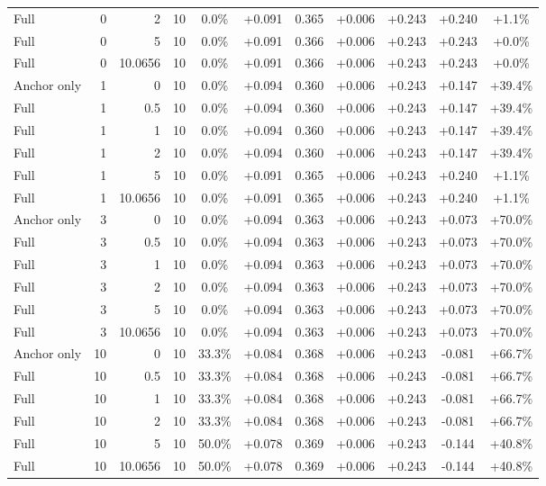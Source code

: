 \begin{table}[htbp]
\begin{tabular}{lrrrccccccc}
Full & 0 & 2 & 10 & 0.0\% & +0.091 & 0.365 & +0.006 & +0.243 & +0.240 & +1.1\% \\
Full & 0 & 5 & 10 & 0.0\% & +0.091 & 0.366 & +0.006 & +0.243 & +0.243 & +0.0\% \\
Full & 0 & 10.0656 & 10 & 0.0\% & +0.091 & 0.366 & +0.006 & +0.243 & +0.243 & +0.0\% \\
Anchor only & 1 & 0 & 10 & 0.0\% & +0.094 & 0.360 & +0.006 & +0.243 & +0.147 & +39.4\% \\
Full & 1 & 0.5 & 10 & 0.0\% & +0.094 & 0.360 & +0.006 & +0.243 & +0.147 & +39.4\% \\
Full & 1 & 1 & 10 & 0.0\% & +0.094 & 0.360 & +0.006 & +0.243 & +0.147 & +39.4\% \\
Full & 1 & 2 & 10 & 0.0\% & +0.094 & 0.360 & +0.006 & +0.243 & +0.147 & +39.4\% \\
Full & 1 & 5 & 10 & 0.0\% & +0.091 & 0.365 & +0.006 & +0.243 & +0.240 & +1.1\% \\
Full & 1 & 10.0656 & 10 & 0.0\% & +0.091 & 0.365 & +0.006 & +0.243 & +0.240 & +1.1\% \\
Anchor only & 3 & 0 & 10 & 0.0\% & +0.094 & 0.363 & +0.006 & +0.243 & +0.073 & +70.0\% \\
Full & 3 & 0.5 & 10 & 0.0\% & +0.094 & 0.363 & +0.006 & +0.243 & +0.073 & +70.0\% \\
Full & 3 & 1 & 10 & 0.0\% & +0.094 & 0.363 & +0.006 & +0.243 & +0.073 & +70.0\% \\
Full & 3 & 2 & 10 & 0.0\% & +0.094 & 0.363 & +0.006 & +0.243 & +0.073 & +70.0\% \\
Full & 3 & 5 & 10 & 0.0\% & +0.094 & 0.363 & +0.006 & +0.243 & +0.073 & +70.0\% \\
Full & 3 & 10.0656 & 10 & 0.0\% & +0.094 & 0.363 & +0.006 & +0.243 & +0.073 & +70.0\% \\
Anchor only & 10 & 0 & 10 & 33.3\% & +0.084 & 0.368 & +0.006 & +0.243 & -0.081 & +66.7\% \\
Full & 10 & 0.5 & 10 & 33.3\% & +0.084 & 0.368 & +0.006 & +0.243 & -0.081 & +66.7\% \\
Full & 10 & 1 & 10 & 33.3\% & +0.084 & 0.368 & +0.006 & +0.243 & -0.081 & +66.7\% \\
Full & 10 & 2 & 10 & 33.3\% & +0.084 & 0.368 & +0.006 & +0.243 & -0.081 & +66.7\% \\
Full & 10 & 5 & 10 & 50.0\% & +0.078 & 0.369 & +0.006 & +0.243 & -0.144 & +40.8\% \\
Full & 10 & 10.0656 & 10 & 50.0\% & +0.078 & 0.369 & +0.006 & +0.243 & -0.144 & +40.8\% \\

\end{tabular}
\end{table}
